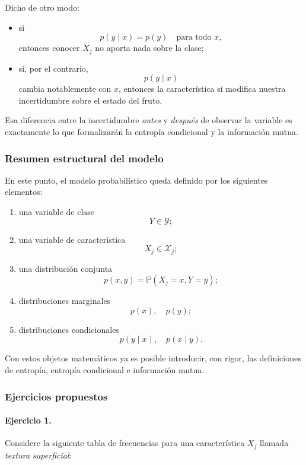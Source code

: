 \documentclass{article}
\begin{document}
Dicho de otro modo:

\begin{itemize}
\item si
\[
p(y\mid x)=p(y) \quad \text{para todo } x,
\]
entonces conocer \(X_j\) no aporta nada sobre la clase;

\item si, por el contrario,
\[
p(y\mid x)
\]
cambia notablemente con \(x\), entonces la característica sí modifica nuestra incertidumbre sobre el estado del fruto.
\end{itemize}

Esa diferencia entre la incertidumbre \emph{antes} y \emph{después} de observar la variable es exactamente lo que formalizarán la entropía condicional y la información mutua.

\subsubsection*{Resumen estructural del modelo}

En este punto, el modelo probabilístico queda definido por los siguientes elementos:

\begin{enumerate}
\item una variable de clase
\[
Y\in\mathcal{Y};
\]

\item una variable de característica
\[
X_j\in\mathcal{X}_j;
\]

\item una distribución conjunta
\[
p(x,y)=\mathbb{P}(X_j=x,Y=y);
\]

\item distribuciones marginales
\[
p(x),\quad p(y);
\]

\item distribuciones condicionales
\[
p(y\mid x),\quad p(x\mid y).
\]
\end{enumerate}

Con estos objetos matemáticos ya es posible introducir, con rigor, las definiciones de entropía, entropía condicional e información mutua.

\subsubsection*{Ejercicios propuestos}

\paragraph{Ejercicio 1.}
Considere la siguiente tabla de frecuencias para una característica \(X_j\) llamada \emph{textura superficial}:
\end{document}
